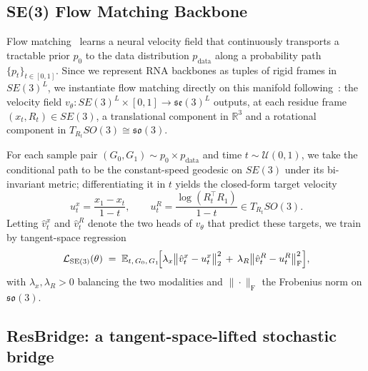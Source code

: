 \documentclass{article}
\begin{document}
\subsection{SE(3) Flow Matching Backbone}\label{sec:se3-fm}

Flow matching~\cite{lipman2022flow,liu2022flow} learns a neural velocity field that continuously transports a tractable prior $p_0$ to the data distribution $p_{\mathrm{data}}$ along a probability path $\{p_t\}_{t\in[0,1]}$. Since we represent RNA backbones as tuples of rigid frames in $SE(3)^L$, we instantiate flow matching directly on this manifold following~\cite{yim2023fast,bose2023se}: the velocity field $v_\theta: SE(3)^L\times[0,1]\to\mathfrak{se}(3)^L$ outputs, at each residue frame $(x_t,R_t)\in SE(3)$, a translational component in $\mathbb{R}^3$ and a rotational component in $T_{R_t}SO(3)\cong\mathfrak{so}(3)$.

For each sample pair $(G_0,G_1)\sim p_0\times p_{\mathrm{data}}$ and time $t\sim\mathcal{U}(0,1)$, we take the conditional path to be the constant-speed geodesic on $SE(3)$ under its bi-invariant metric; differentiating it in $t$ yields the closed-form target velocity
\begin{equation}
u^{x}_{t}=\frac{x_{1}-x_{t}}{1-t},\qquad u^{R}_{t}=\frac{\log(R_{t}^{\top}R_{1})}{1-t}\in T_{R_{t}}SO(3).
\end{equation}
Letting $\hat{v}^{x}_{t}$ and $\hat{v}^{R}_{t}$ denote the two heads of $v_\theta$ that predict these targets, we train by tangent-space regression
\begin{equation}
\mathcal{L}_{\mathrm{SE(3)}}(\theta)\;=\;\mathbb{E}_{t,\,G_0,\,G_1}\!\Bigl[\lambda_x\bigl\|\hat{v}^{x}_{t}-u^{x}_{t}\bigr\|_2^{2}\,+\,\lambda_R\bigl\|\hat{v}^{R}_{t}-u^{R}_{t}\bigr\|_{\mathrm{F}}^{2}\Bigr],
\label{eq:fm-loss}
\end{equation}
with $\lambda_x,\lambda_R>0$ balancing the two modalities and $\|\cdot\|_{\mathrm{F}}$ the Frobenius norm on $\mathfrak{so}(3)$.



\subsection{ResBridge: a tangent-space-lifted stochastic bridge}\label{sec:resbridge}
\end{document}

